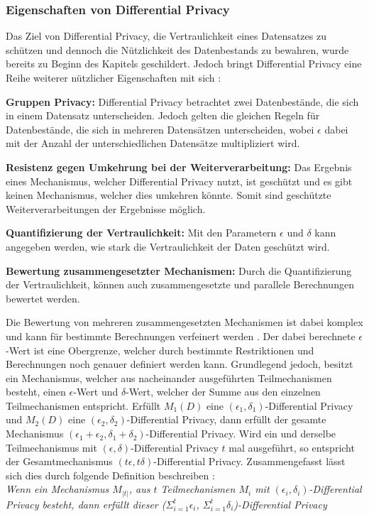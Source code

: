 \subsubsection*{Eigenschaften von Differential Privacy}
Das Ziel von Differential Privacy, die Vertraulichkeit eines Datensatzes zu schützen und dennoch die Nützlichkeit des Datenbestands zu bewahren, wurde bereits zu Beginn des Kapitels geschildert.
Jedoch bringt Differential Privacy eine Reihe weiterer nützlicher Eigenschaften mit sich \cite{P-27}:
\begin{compactitem}
    \item \textbf{Gruppen Privacy:} Differential Privacy betrachtet zwei Datenbestände, die sich in einem Datensatz unterscheiden. Jedoch gelten die gleichen Regeln für Datenbestände, die sich in mehreren Datensätzen unterscheiden, wobei $\epsilon$ dabei mit der Anzahl der unterschiedlichen Datensätze multipliziert wird.
    \item \textbf{Resistenz gegen Umkehrung bei der Weiterverarbeitung:} Das Ergebnis eines Mechanismus, welcher Differential Privacy nutzt, ist geschützt und es gibt keinen Mechanismus, welcher dies umkehren könnte. Somit sind geschützte Weiterverarbeitungen der Ergebnisse möglich.
    \item \textbf{Quantifizierung der Vertraulichkeit:} Mit den Parametern $\epsilon$ und $\delta$ kann angegeben werden, wie stark die Vertraulichkeit der Daten geschützt wird.
    \item \textbf{Bewertung zusammengesetzter Mechanismen:} Durch die Quantifizierung der Vertraulichkeit, können auch zusammengesetzte und parallele Berechnungen bewertet werden.
\end{compactitem}



Die Bewertung von mehreren zusammengesetzten Mechanismen ist dabei komplex und kann für bestimmte Berechnungen verfeinert werden \cite{P-27}. 
Der dabei berechnete $\epsilon$-Wert ist eine Obergrenze, welcher durch bestimmte Restriktionen und Berechnungen noch genauer definiert werden kann.
Grundlegend jedoch, besitzt ein Mechanismus, welcher aus nacheinander ausgeführten Teilmechanismen besteht, einen $\epsilon$-Wert und $\delta$-Wert, welcher der Summe aus den einzelnen Teilmechanismen entspricht.
Erfüllt $M_1(D)$ eine $(\epsilon_1,\delta_1)$-Differential Privacy und $M_2(D)$ eine $(\epsilon_2,\delta_2)$-Differential Privacy, dann erfüllt der gesamte Mechanismus $(\epsilon_1 + \epsilon_2,\delta_1 + \delta_2)$-Differential Privacy.
Wird ein und derselbe Teilmechanismus mit $(\epsilon,\delta)$-Differential Privacy $t$ mal ausgeführt, so entspricht der Gesamtmechanismus $(t\epsilon,t\delta)$-Differential Privacy.
Zusammengefasst lässt sich dies durch folgende Definition beschreiben \cite{P-27}:\\
\textit{
    Wenn ein Mechanismus $M_{|t|}$, aus $t$ Teilmechanismen $M_i$ mit $(\epsilon_i,\delta_i)$-Differential Privacy besteht, dann erfüllt dieser  ($\Sigma_{i=1}^{t} \epsilon_i $, $\Sigma_{i=1}^{t} \delta_i $)-Differential Privacy
}

